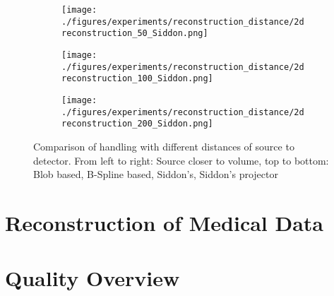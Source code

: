 \begin{figure}[h]
{{\begin{subfigure}[b]{0.3125\textwidth}
				\texttt{[image: ./figures/experiments/reconstruction\_distance/2dreconstruction\_50\_Siddon.png]}
			\end{subfigure}
			\begin{subfigure}[b]{0.3125\textwidth}
				\texttt{[image: ./figures/experiments/reconstruction\_distance/2dreconstruction\_100\_Siddon.png]}
			\end{subfigure}
			\begin{subfigure}[b]{0.3125\textwidth}
				\texttt{[image: ./figures/experiments/reconstruction\_distance/2dreconstruction\_200\_Siddon.png]}
			\end{subfigure}
		}}
	\caption{Comparison of handling with different distances of source to detector.
        From left to right: Source closer to volume, top to bottom: Blob based, B-Spline based,
        Siddon's, Siddon's projector}%
	\label{fig:reconstruction_fewangles}
\end{figure}

\section{Reconstruction of Medical Data}\label{sec:experiments_medical_projection}


\section{Quality Overview}\label{sec:experiments_quality_projection}

